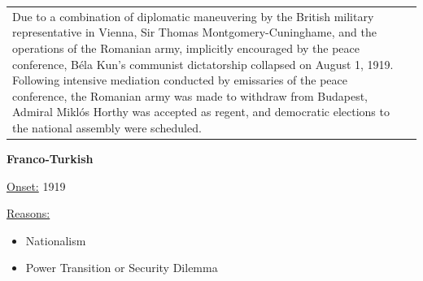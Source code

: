 {\begin{longtable}{p{}p{}}
Due to a combination of diplomatic maneuvering by the British military representative in Vienna, Sir Thomas Montgomery-Cuninghame, and the operations of the Romanian army, implicitly encouraged by the peace conference, Béla Kun's communist dictatorship collapsed on August 1, 1919. Following intensive mediation conducted by emissaries of the peace conference, the Romanian army was made to withdraw from Budapest, Admiral Miklós Horthy was accepted as regent, and democratic elections to the national assembly were scheduled.
\\
\end{longtable}}
\clearpage
         \textbf{Franco-Turkish} 

          \underline{Onset:} 1919         

\underline{Reasons:}
\begin{itemize}
\item Nationalism
\item Power Transition or Security Dilemma
\end{itemize}

